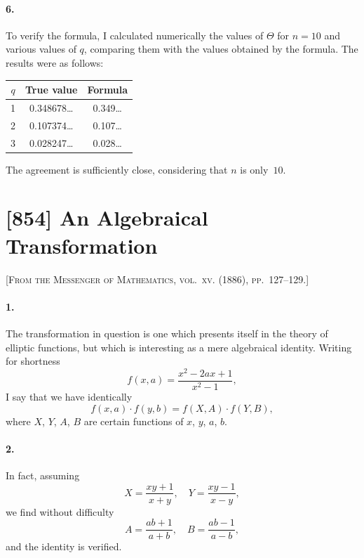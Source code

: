 \documentclass[11pt,a4paper]{article}
\theoremstyle{definition}
\begin{document}
\paragraph{6.} To verify the formula, I calculated numerically the values of $\Theta$ for $n = 10$ and various values of $q$, comparing them with the values obtained by the formula. The results were as follows:

\begin{center}
\begin{tabular}{c|c|c}
$q$ & True value & Formula \\
\hline
1 & 0.348678\ldots & 0.349\ldots \\
2 & 0.107374\ldots & 0.107\ldots \\
3 & 0.028247\ldots & 0.028\ldots \\
\end{tabular}
\end{center}

\noindent The agreement is sufficiently close, considering that $n$ is only~$10$.

\newpage
\section*{[854] An Algebraical Transformation}

\noindent\textsc{[From the Messenger of Mathematics, vol.~xv. (1886), pp.~127--129.]}

\smallskip

\paragraph{1.} The transformation in question is one which presents itself in the theory of elliptic functions, but which is interesting as a mere algebraical identity. Writing for shortness
\[
f(x, a) = \frac{x^{2} - 2ax + 1}{x^{2} - 1},
\]
I say that we have identically
\[
f(x, a) \cdot f(y, b) = f(X, A) \cdot f(Y, B),
\]
where $X$, $Y$, $A$, $B$ are certain functions of $x$, $y$, $a$, $b$.

\paragraph{2.} In fact, assuming
\[
X = \frac{xy + 1}{x + y}, \quad Y = \frac{xy - 1}{x - y},
\]
we find without difficulty
\[
A = \frac{ab + 1}{a + b}, \quad B = \frac{ab - 1}{a - b},
\]
and the identity is verified.
\end{document}
